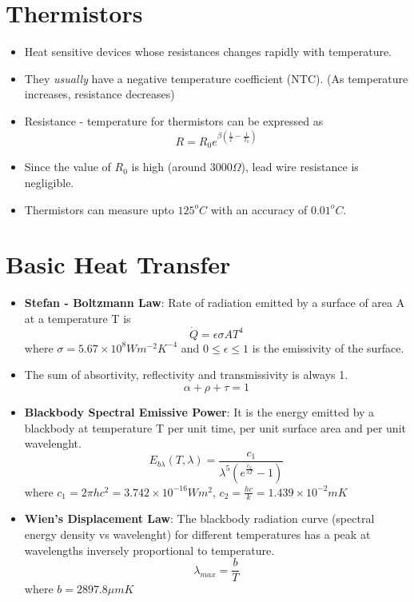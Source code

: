 \documentclass{article}
\begin{document}
\section{Thermistors}
	\begin{itemize}
		\item Heat sensitive devices whose resistances changes rapidly with temperature. 
		\item They \textit{usually} have a negative temperature coefficient (NTC). (As temperature increases, resistance decreases) 
		\item Resistance - temperature for thermistors can be expressed as
		\[R = R_0 e^{\beta(\frac{1}{T}-\frac{1}{T_0})}\]
		\item Since the value of $R_0$ is high (around $3000\Omega$), lead wire resistance is negligible.
		\item Thermistors can measure upto $125^{o}C$ with an accuracy of $0.01^{o}C$. 
	\end{itemize}

\section{Basic Heat Transfer}
	\begin{itemize}
		\item \textbf{Stefan - Boltzmann Law}: Rate of radiation emitted by a surface of area A at a temperature T is 
		\[\dot{Q} = \epsilon \sigma A T^4\]
		where $\sigma = 5.67 \times 10^8 Wm^{-2}K^{-4}$ and $ 0 \leq \epsilon\leq 1$ is the emissivity of the surface.
		\item The sum of absortivity, reflectivity and transmissivity is always 1.
		\[\alpha + \rho + \tau =1\]
		\item \textbf{Blackbody Spectral Emissive Power}: It is the energy emitted by a blackbody at temperature T per unit time, per unit surface area  and per unit wavelenght. 
		\[\boxed{E_{b\lambda}(T, \lambda) = \frac{c_1}{\lambda^5 (e^{\frac{c_2}{\lambda T}}-1)}} \] 
		where $c_1 = 2\pi h c^2 = 3.742 \times 10^{-16} Wm^2$,    $c_2 = \frac{hc}{k} = 1.439 \times 10^{-2}mK$
		\item \textbf{Wien's Displacement Law}: The blackbody radiation curve (spectral energy density vs wavelenght) for different temperatures has a peak at wavelengths inversely proportional to temperature. 
		\[\lambda_{max} = \frac{b}{T}\]
		where $b= 2897.8 \mu mK$
	\end{itemize}
\end{document}

